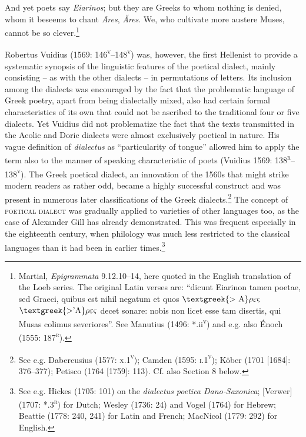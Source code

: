 \documentclass[12pt]{article}
\newenvironment{styleStandard}{\renewcommand\baselinestretch{1.25}\setlength\leftskip{0in}\setlength\rightskip{0in}\setlength\parindent{0.1972in}\setlength\parfillskip{0pt plus 1fil}\setlength\parskip{0in plus 1pt}\writerlistparindent\writerlistleftskip\leavevmode\normalfont\normalsize\writerlistlabel\ignorespaces}{\unskip\vspace{0in plus 1pt}\par}
\newenvironment{styleQuote}{\renewcommand\baselinestretch{1.25}\setlength\leftskip{0.3937in}\setlength\rightskip{0in}\setlength\parindent{0in}\setlength\parfillskip{0pt plus 1fil}\setlength\parskip{0.1665in plus 0.016649999in}\writerlistparindent\writerlistleftskip\leavevmode\normalfont\normalsize\writerlistlabel\ignorespaces}{\unskip\vspace{0.1665in plus 0.016649999in}\par}
\newcommand\writerlistleftskip{}
\newcommand\writerlistparindent{}
\newcommand\writerlistlabel{}
\begin{document}
\begin{styleQuote}
And yet poets say \textit{Eiarinos}; {\textbar} but they are Greeks to whom nothing is denied, {\textbar} whom it beseems to chant \textit{\=Ares}, \textit{Ăres}. {\textbar} We, who cultivate more austere Muses, {\textbar} cannot be so clever.\footnote{ Martial, \textit{Epigrammata} 9.12.10–14, here quoted in the English translation of the Loeb series. The original Latin verses are: “dicunt Eiarinon tamen poetae, {\textbar} sed Graeci, quibus est nihil negatum {\textbar} et quos $\text{\textgreek{>~A}}\rho \varepsilon \varsigma $ $\text{\textgreek{>'A}}\rho \varepsilon \varsigma $ decet sonare: {\textbar} nobis non licet esse tam disertis, {\textbar} qui Musas colimus severiores”. See Manutius (1496: *.ii\textsc{\textsuperscript{v}}) and e.g. also Énoch (1555: 187\textsc{\textsuperscript{r}}).}
\end{styleQuote}

\begin{styleStandard}
Robertus Vuidius (1569: 146\textsc{\textsuperscript{v}}–148\textsc{\textsuperscript{v}}) was, however, the first Hellenist to provide a systematic synopsis of the linguistic features of the poetical dialect, mainly consisting – as with the other dialects – in permutations of letters. Its inclusion among the dialects was encouraged by the fact that the problematic language of Greek poetry, apart from being dialectally mixed, also had certain formal characteristics of its own that could not be ascribed to the traditional four or five dialects. Yet Vuidius did not problematize the fact that the texts transmitted in the Aeolic and Doric dialects were almost exclusively poetical in nature. His vague definition of \textit{dialectus} as “particularity of tongue” allowed him to apply the term also to the manner of speaking characteristic of poets (Vuidius 1569: 138\textsc{\textsuperscript{r}}–138\textsc{\textsuperscript{v}}). The Greek poetical dialect, an innovation of the 1560s that might strike modern readers as rather odd, became a highly successful construct and was present in numerous later classifications of the Greek dialects.\footnote{ See e.g. Dabercusius (1577: \textsc{x}.1\textsc{\textsuperscript{v}}); Camden (1595: \textsc{i.1}\textsc{\textsuperscript{v}}); Köber (1701 [1684]: 376–377); Petisco (1764 [1759]: 113). Cf. also Section 8 below.} The concept of \textsc{poetical dialect} was gradually applied to varieties of other languages too, as the case of Alexander Gill has already demonstrated. This was frequent especially in the eighteenth century, when philology was much less restricted to the classical languages than it had been in earlier times.\footnote{ See e.g. Hickes (1705: 101) on the \textit{dialectus poetica Dano-Saxonica}; [Verwer] (1707: *.3\textsc{\textsuperscript{r}}) for Dutch; Wesley (1736: 24) and Vogel (1764) for Hebrew; Beattie (1778: 240, 241) for Latin and French; MacNicol (1779: 292) for English.}
\end{styleStandard}
\end{document}
